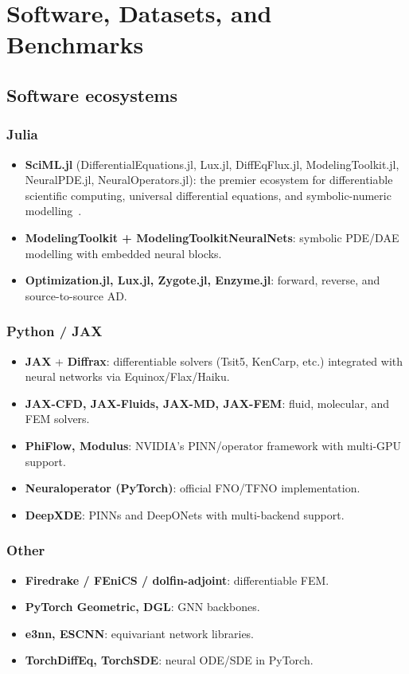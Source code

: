 \chapter{Software, Datasets, and Benchmarks}
\label{ch:software}

\section{Software ecosystems}
\subsection{Julia}
\begin{itemize}
\item \textbf{SciML.jl} (DifferentialEquations.jl, Lux.jl,
DiffEqFlux.jl, ModelingToolkit.jl, NeuralPDE.jl, NeuralOperators.jl):
the premier ecosystem for differentiable scientific computing,
universal differential equations, and symbolic-numeric
modelling~\cite{rackauckas2017diffeq}.
\item \textbf{ModelingToolkit + ModelingToolkitNeuralNets}: symbolic
PDE/DAE modelling with embedded neural blocks.
\item \textbf{Optimization.jl, Lux.jl, Zygote.jl, Enzyme.jl}: forward,
reverse, and source-to-source AD.
\end{itemize}

\subsection{Python / JAX}
\begin{itemize}
\item \textbf{JAX} + \textbf{Diffrax}: differentiable solvers (Tsit5,
KenCarp, etc.) integrated with neural networks via
Equinox/Flax/Haiku.
\item \textbf{JAX-CFD, JAX-Fluids, JAX-MD, JAX-FEM}: fluid, molecular,
and FEM solvers.
\item \textbf{PhiFlow, Modulus}: NVIDIA's PINN/operator framework with
multi-GPU support.
\item \textbf{Neuraloperator (PyTorch)}: official FNO/TFNO
implementation.
\item \textbf{DeepXDE}: PINNs and DeepONets with multi-backend support.
\end{itemize}

\subsection{Other}
\begin{itemize}
\item \textbf{Firedrake / FEniCS / dolfin-adjoint}: differentiable FEM.
\item \textbf{PyTorch Geometric, DGL}: GNN backbones.
\item \textbf{e3nn, ESCNN}: equivariant network libraries.
\item \textbf{TorchDiffEq, TorchSDE}: neural ODE/SDE in PyTorch.
\end{itemize}

